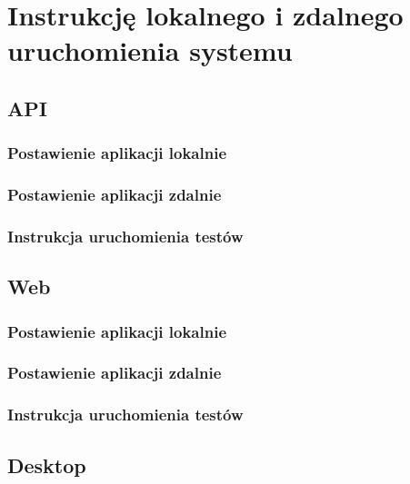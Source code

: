 \documentclass{article}
\begin{document}
\section{Instrukcję lokalnego i zdalnego uruchomienia systemu}
    \subsection{API}
        \subsubsection{Postawienie aplikacji lokalnie}
        
        \subsubsection{Postawienie aplikacji zdalnie}
        
        \subsubsection{Instrukcja uruchomienia testów}
        
    \subsection{Web}
        \subsubsection{Postawienie aplikacji lokalnie}
        
        \subsubsection{Postawienie aplikacji zdalnie}
        
        \subsubsection{Instrukcja uruchomienia testów}
        
    \subsection{Desktop}
\end{document}
